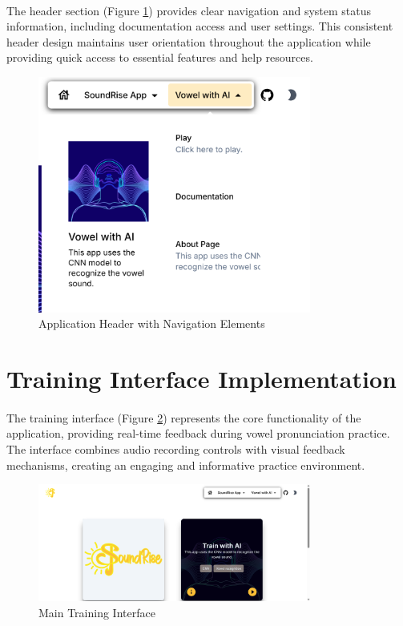 \paragraph{}
The header section (Figure \ref{fig:header}) provides clear navigation and system status information, including documentation access and user settings. This consistent header design maintains user orientation throughout the application while providing quick access to essential features and help resources.

\begin{figure}[htbp]
    \centering
    \includegraphics[width=0.8\textwidth]{res/images/webapp/homepage-header.png}
    \caption{Application Header with Navigation Elements}
    \label{fig:header}
\end{figure}

\section{Training Interface Implementation}
\label{sec:training-interface}

\paragraph{}
The training interface (Figure \ref{fig:interface_training}) represents the core functionality of the application, providing real-time feedback during vowel pronunciation practice. The interface combines audio recording controls with visual feedback mechanisms, creating an engaging and informative practice environment.

\begin{figure}[htbp]
    \centering
    \includegraphics[width=0.8\textwidth]{res/images/webapp/interface.png}
    \caption{Main Training Interface}
    \label{fig:interface_training}
\end{figure}

